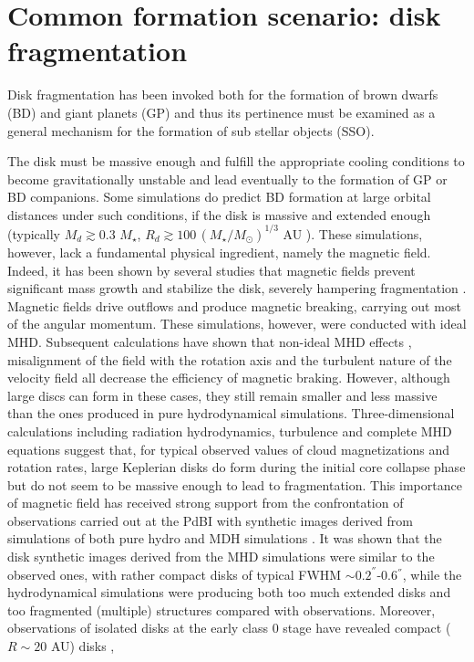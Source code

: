 \section{Common formation scenario: disk fragmentation}
\label{sect:formation_disk}

Disk fragmentation has been invoked both for the formation of brown dwarfs (BD) and giant planets (GP) and thus its pertinence must be examined as a general mechanism for the formation of sub stellar objects (SSO). 

The disk must be massive enough and fulfill the appropriate cooling conditions to become gravitationally unstable and lead eventually to the formation of GP or BD companions. 
Some simulations \citep{Stamatellos2007, Vorobyov2006} do predict BD formation at large orbital distances under such conditions, 
if the disk is massive and extended enough (typically $M_d\gtrsim 0.3\,\,M_\star$, $R_d\gtrsim 100\,(M_\star/ M_\odot)^{1/3}$ AU \citep{Stamatellos2009}). 
These simulations, however, lack a fundamental physical ingredient, namely the magnetic field. Indeed, it has been shown by several studies that magnetic fields prevent significant 
mass growth and stabilize the disk, severely hampering fragmentation \citep[e.g.][]{Hennebelle2008b,Price2009,Commercon2010,Machida2010}. 
Magnetic fields drive outflows and produce magnetic breaking, carrying out most of the angular momentum. 
These simulations, however, were conducted with ideal MHD. Subsequent calculations have shown that non-ideal MHD effects \citep[e.g.][]{Dapp2012,Machida2011b}, misalignment of the field with the rotation axis \citep{Hennebelle2009b,Joos2012,Li2013} 
and the turbulent nature of the velocity field \citep{Joos2013,Seifried2012,Seifried2013} all decrease the efficiency of magnetic braking. 
However, although large discs can form in these cases, they still remain smaller and less massive than the ones produced in pure 
hydrodynamical simulations. 
Three-dimensional calculations including radiation hydrodynamics, turbulence and complete MHD equations suggest that, for typical observed values of cloud magnetizations and rotation rates, large Keplerian disks do form during the initial core collapse phase
but do not seem to be massive enough to lead to fragmentation. 
This importance of magnetic field has received strong support from the confrontation of observations carried out at the PdBI with synthetic images derived from simulations of both pure hydro and MDH simulations \citep{Maury2010}. It was shown that the disk synthetic images derived from the MHD simulations were similar to the observed ones, with rather compact disks of typical FWHM $\sim 0.2^{''}$-0.6$^{''}$, while the hydrodynamical simulations were producing both too much extended disks and too fragmented (multiple) structures compared with observations. Moreover, observations of isolated disks at the early class 0 stage have revealed compact ($R\sim 20$ AU) disks \citep{Rodriguez2005}, 
